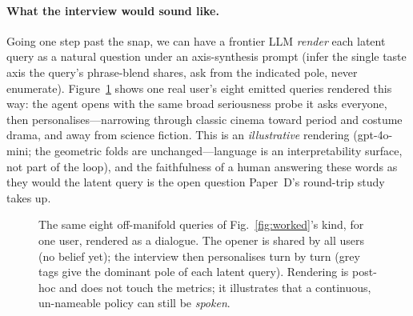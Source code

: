 \documentclass[11pt]{article}
\begin{document}
\paragraph{What the interview would sound like.} Going one step past the snap, we can have a frontier LLM \emph{render}
each latent query as a natural question under an axis-synthesis prompt (infer the single taste axis the query's
phrase-blend shares, ask from the indicated pole, never enumerate). Figure~\ref{fig:interview} shows one real user's
eight emitted queries rendered this way: the agent opens with the same broad seriousness probe it asks everyone, then
personalises---narrowing through classic cinema toward period and costume drama, and away from science fiction. This is
an \emph{illustrative} rendering (gpt-4o-mini; the geometric folds are unchanged---language is an interpretability
surface, not part of the loop), and the faithfulness of a human answering these words as they would the latent query is
the open question Paper~D's round-trip study takes up.

\begin{figure}[t]
\centering
{}
\caption{The same eight off-manifold queries of Fig.~\ref{fig:worked}'s kind, for one user, rendered as a dialogue.
The opener is shared by all users (no belief yet); the interview then personalises turn by turn (grey tags give the
dominant pole of each latent query). Rendering is post-hoc and does not touch the metrics; it illustrates that a
continuous, un-nameable policy can still be \emph{spoken}.}
\label{fig:interview}
\end{figure}
\end{document}
